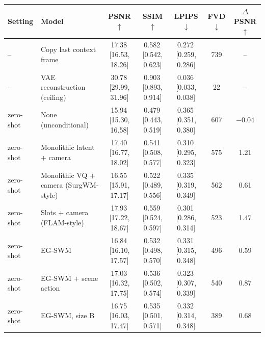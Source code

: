 \begin{tabular}{llccccc}
\toprule
Setting & Model & PSNR$\uparrow$ & SSIM$\uparrow$ & LPIPS$\downarrow$ & FVD$\downarrow$ & $\Delta$PSNR$\uparrow$ \\
\midrule
-- & Copy last context frame & 17.38\,{\scriptsize[16.53, 18.26]} & 0.582\,{\scriptsize[0.542, 0.623]} & 0.272\,{\scriptsize[0.259, 0.286]} & 739 & -- \\
-- & VAE reconstruction (ceiling) & 30.78\,{\scriptsize[29.99, 31.96]} & 0.903\,{\scriptsize[0.893, 0.914]} & 0.036\,{\scriptsize[0.033, 0.038]} & 22 & -- \\
\midrule
zero-shot & None (unconditional) & 15.94\,{\scriptsize[15.30, 16.58]} & 0.479\,{\scriptsize[0.443, 0.519]} & 0.365\,{\scriptsize[0.351, 0.380]} & 607 & $-$0.04 \\
zero-shot & Monolithic latent + camera & 17.40\,{\scriptsize[16.77, 18.02]} & 0.541\,{\scriptsize[0.508, 0.577]} & 0.310\,{\scriptsize[0.295, 0.323]} & 575 & 1.21 \\
zero-shot & Monolithic VQ + camera (SurgWM-style) & 16.55\,{\scriptsize[15.91, 17.17]} & 0.522\,{\scriptsize[0.489, 0.556]} & 0.335\,{\scriptsize[0.319, 0.349]} & 562 & 0.61 \\
zero-shot & Slots + camera (FLAM-style) & 17.93\,{\scriptsize[17.22, 18.67]} & 0.559\,{\scriptsize[0.524, 0.597]} & 0.301\,{\scriptsize[0.286, 0.314]} & 523 & 1.47 \\
zero-shot & EG-SWM & 16.84\,{\scriptsize[16.10, 17.57]} & 0.532\,{\scriptsize[0.498, 0.570]} & 0.331\,{\scriptsize[0.315, 0.348]} & 496 & 0.59 \\
zero-shot & EG-SWM + scene action & 17.03\,{\scriptsize[16.32, 17.75]} & 0.536\,{\scriptsize[0.502, 0.574]} & 0.323\,{\scriptsize[0.307, 0.339]} & 540 & 0.87 \\
zero-shot & EG-SWM, size B & 16.75\,{\scriptsize[16.03, 17.47]} & 0.535\,{\scriptsize[0.501, 0.571]} & 0.332\,{\scriptsize[0.314, 0.348]} & 389 & 0.68 \\
\bottomrule
\end{tabular}
